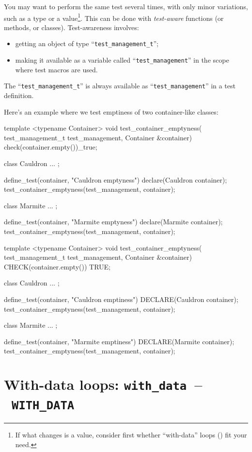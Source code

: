 \documentclass[twoside, a4paper, article]{memoir}
\newcommand*\testudocolor{\color{red!80!blue}}
\newcommand*\testudo[1]{\texttt{\testudocolor{}#1}}
\newcommand*\testudopair[2]{\testudo{#1}~--~\testudo{#2}}
\newcommand\chaptertestudopair[3]{%
  \chapter[#1]{#1: \testudopair{#2}{#3}}}
\begin{document}
You may want to perform the same test several times, with only minor
variations, such as a type or a value\footnote{If what changes is a value,
  consider first whether ``with-data'' loops () fit
  your need.}.  This can be done with \emph{test-aware} functions (or methods,
or classes).  Test-awareness involves:
\begin{itemize}
\item getting an object of type ``\texttt{test\_management\_t}'';
\item making it available as a variable called ``\texttt{test\_management}'' in
  the scope where test macros are used.
\end{itemize}
The ``\texttt{test\_management\_t}'' is always available as
``\texttt{test\_management}'' in a test definition.

Here's an example where we test emptiness of two container-like classes:
\begin{cpplisting}
template <typename Container>
void test_container_emptyness(
    test_management_t test_management,
    Container &container) {
  check(container.empty())_true;
}

class Cauldron { ... };

define_test(container, "Cauldron emptyness") {
  declare(Cauldron container);
  test_container_emptyness(test_management, container);
}

class Marmite { ... };

define_test(container, "Marmite emptyness") {
  declare(Marmite container);
  test_container_emptyness(test_management, container);
}
\end{cpplisting}

\begin{cpplisting}
template <typename Container>
void test_container_emptyness(
    test_management_t test_management,
    Container &container)
{
  CHECK(container.empty()) TRUE;
}

class Cauldron { ... };

define_test(container, "Cauldron emptiness")
{
  DECLARE(Cauldron container);
  test_container_emptyness(test_management, container);
}

class Marmite { ... };

define_test(container, "Marmite emptiness")
{
  DECLARE(Marmite container);
  test_container_emptyness(test_management, container);
}
\end{cpplisting}


\chaptertestudopair{With-data loops}{with\_data}{WITH\_DATA}
\label{cha:with-data-loops}
\end{document}
